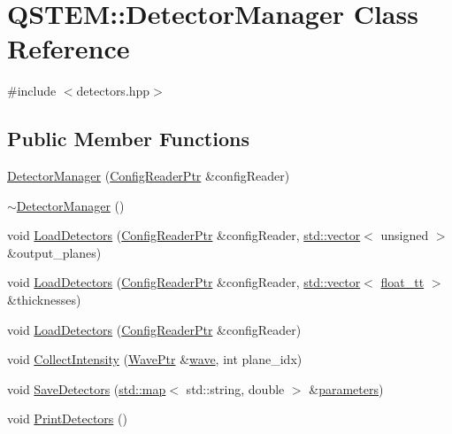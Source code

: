 \hypertarget{class_q_s_t_e_m_1_1_detector_manager}{\section{Q\-S\-T\-E\-M\-:\-:Detector\-Manager Class Reference}
\label{class_q_s_t_e_m_1_1_detector_manager}
}


{\ttfamily \#include $<$detectors.\-hpp$>$}

\subsection*{Public Member Functions}
\begin{DoxyCompactItemize}
\item 
\hyperlink{class_q_s_t_e_m_1_1_detector_manager_a4f61af8fe5aa86d4c687a2077478f144}{Detector\-Manager} (\hyperlink{namespace_q_s_t_e_m_af9424707fe9f6503298f49b41304bd35}{Config\-Reader\-Ptr} \&config\-Reader)
\item 
\hyperlink{class_q_s_t_e_m_1_1_detector_manager_a8aa5af0b3e958c3068d04df0d4e96622}{$\sim$\-Detector\-Manager} ()
\item 
void \hyperlink{class_q_s_t_e_m_1_1_detector_manager_a7b57399fff7268460a6a3d97be50640d}{Load\-Detectors} (\hyperlink{namespace_q_s_t_e_m_af9424707fe9f6503298f49b41304bd35}{Config\-Reader\-Ptr} \&config\-Reader, \hyperlink{qmb_8m_af54b69a32590de218622e869b06b47b3}{std\-::vector}$<$ unsigned $>$ \&output\-\_\-planes)
\item 
void \hyperlink{class_q_s_t_e_m_1_1_detector_manager_aea1561f6a6d3b0c4042071136acbdd15}{Load\-Detectors} (\hyperlink{namespace_q_s_t_e_m_af9424707fe9f6503298f49b41304bd35}{Config\-Reader\-Ptr} \&config\-Reader, \hyperlink{qmb_8m_af54b69a32590de218622e869b06b47b3}{std\-::vector}$<$ \hyperlink{namespace_q_s_t_e_m_a915d7caa497280d9f927c4ce8d330e47}{float\-\_\-tt} $>$ \&thicknesses)
\item 
void \hyperlink{class_q_s_t_e_m_1_1_detector_manager_a5c90e62de2adf6c2d371496b6a7ba2d6}{Load\-Detectors} (\hyperlink{namespace_q_s_t_e_m_af9424707fe9f6503298f49b41304bd35}{Config\-Reader\-Ptr} \&config\-Reader)
\item 
void \hyperlink{class_q_s_t_e_m_1_1_detector_manager_a1fa131cfdcf7dde914c3dba9b1a4cfbb}{Collect\-Intensity} (\hyperlink{namespace_q_s_t_e_m_ab42c5fe058973736465964e84b504b74}{Wave\-Ptr} \&\hyperlink{sim_image_from_wave_8m_acb3ac767ec1048cf315487da2b577ca4}{wave}, int plane\-\_\-idx)
\item 
void \hyperlink{class_q_s_t_e_m_1_1_detector_manager_a7497dc1fa17bfb2b2f252fd80929b190}{Save\-Detectors} (\hyperlink{_displacement_params_8m_af619c74fd72bdb64d115463dff2720cd}{std\-::map}$<$ std\-::string, double $>$ \&\hyperlink{sim_image_from_wave_8m_acb6d7970e73c00effe1d16e23142f11d}{parameters})
\item 
void \hyperlink{class_q_s_t_e_m_1_1_detector_manager_abecffaed4d8096221cd13d0cff383418}{Print\-Detectors} ()
\end{DoxyCompactItemize}


